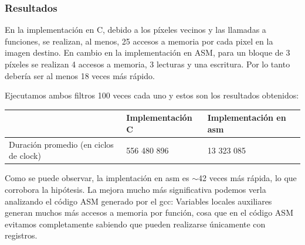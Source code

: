 \subsubsection{Resultados}

En la implementación en C, debido a los píxeles vecinos y las llamadas a funciones, se realizan, al menos, 25 accesos a memoria por cada pixel en la imagen destino.
En cambio en la implementación en ASM, para un bloque de 3 píxeles se realizan 4 accesos a memoria, 3 lecturas y una escritura. Por lo tanto debería ser al menos 18 veces más rápido.

Ejecutamos ambos filtros 100 veces cada uno y estos son los resultados obtenidos:

\begin{center}
    \begin{tabular}{|l|l|l|}
        \hline
         & Implementación C & Implementación en asm  \\
        \hline
        Duración promedio (en ciclos de clock) & 556 480 896        & 13 323 085 \\
        \hline
    \end{tabular}
\end{center}

Como se puede observar, la implentación en asm es $\sim$42 veces más rápida, lo que corrobora la hipótesis. La mejora mucho más significativa podemos verla analizando el código ASM generado por el gcc:
Variables locales auxiliares generan muchos más accesos a memoria por función, cosa que en el código ASM evitamos completamente sabiendo que pueden realizarse únicamente con registros.